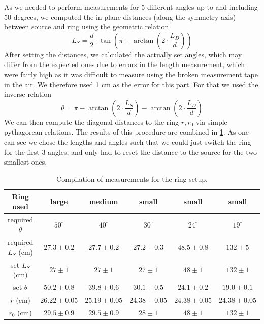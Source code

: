 \documentclass[a4paper,12pt]{article}
\begin{document}
As we needed to perform measurements for 5 different angles up to and including 50 degrees, we computed the in plane distances (along the symmetry axis) between source and ring using the geometric relation
\begin{equation}
	L_S = \frac{d}{2} \cdot \tan{\left( \pi - \arctan{\left( 2 \cdot \frac{L_D}{d} \right)} \right)}
\end{equation}
After setting the distances, we calculated the actually set angles, which may differ from the expected ones due to errors in the length measurement, which were fairly high as it was difficult to measure using the broken measurement tape in the air. We therefore used 1 cm as the error for this part. For that we used the inverse relation
\begin{equation}
	\theta = \pi - \arctan{\left( 2 \cdot \frac{L_S}{d} \right)} - \arctan{\left( 2 \cdot \frac{L_D}{d} \right)}
\end{equation}
We can then compute the diagonal distances to the ring $r, r_0$ via simple pythagorean relations. The results of this procedure are combined in \cref{tab:ringsetup}. As one can see we chose the lengths and angles such that we could just switch the ring for the first 3 angles, and only had to reset the distance to the source for the two smallest ones.

\begin{table}[H]
	\renewcommand{\arraystretch}{1}
	\centering
	\Large
	\begin{adjustbox}{width=\textwidth}
		\begin{tabular}{c|ccccc}
			\hline
			Ring used & large & medium & small & small & small \\
			\hline
			required $\theta$ & $50^\circ$ & $40^\circ$ & $30^\circ$ & $24^\circ$ & $19^\circ$ \\
			\hline
			required $L_S$ (cm) & $27.3 \pm 0.2$ & $27.7 \pm 0.2$ & $27.2 \pm 0.3$ & $48.5 \pm 0.8$ & $132 \pm 5$ \\
			\hline
			set $L_S$ (cm) & $27 \pm 1$ & $27 \pm 1$ & $27 \pm 1$ & $48 \pm 1$ & $132 \pm 1$ \\
			\hline
			set $\theta$ & $50.2 \pm 0.8$ & $39.8 \pm 0.6$ & $30.1 \pm 0.5$ & $24.1 \pm 0.2$ & $19.0 \pm 0.1$ \\
			\hline
			$r$ (cm) & $26.22 \pm 0.05$ & $25.19 \pm 0.05$ & $24.38 \pm 0.05$ & $24.38 \pm 0.05$ & $24.38 \pm 0.05$ \\
			\hline
			$r_0$ (cm) & $29.5 \pm 0.9$ & $29.5 \pm 0.9$ & $28 \pm 1$ & $48 \pm 1$ & $132 \pm 1$ \\
			\hline
		\end{tabular}
	\end{adjustbox}
	\caption{Compilation of measurements for the ring setup. }
	\label{tab:ringsetup}
\end{table}
 
\end{document}
